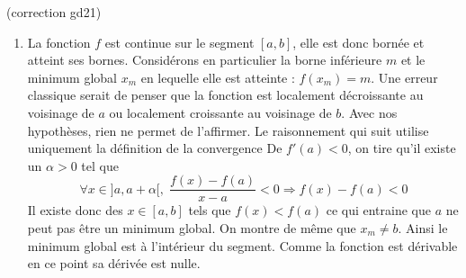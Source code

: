 \begin{tiny}(correction gd21)\end{tiny}
\begin{enumerate}
 \item La fonction $f$ est continue sur le segment $[a,b]$, elle est donc bornée et atteint ses bornes. Considérons en particulier la borne inférieure $m$ et le minimum global $x_m$ en lequelle elle est atteinte : $f(x_m)=m$.\newline
Une erreur classique serait de penser que la fonction est localement décroissante au voisinage de $a$ ou localement croissante au voisinage de $b$. Avec nos hypothèses, rien ne permet de l'affirmer. Le raisonnement qui suit utilise uniquement la définition de la convergence \newline
De $f'(a)<0$, on tire qu'il existe un $\alpha >0$ tel que
\begin{displaymath}
 \forall x\in]a,a+\alpha[, \;\frac{f(x)-f(a)}{x-a}<0 \Rightarrow f(x)-f(a)<0
\end{displaymath}
Il existe donc des $x\in[a,b]$ tels que $f(x)<f(a)$ ce qui entraine que $a$ ne peut pas être un minimum global.\newline
On montre de même que $x_m\neq b$. Ainsi le minimum global est à l'intérieur du segment. Comme la fonction est dérivable en ce point sa dérivée est nulle.
\end{enumerate}
